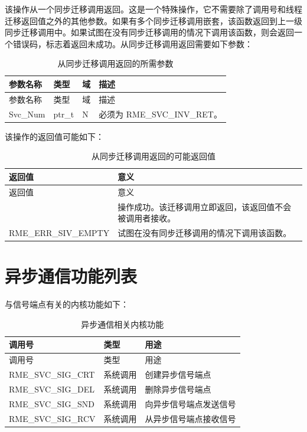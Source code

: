该操作从一个同步迁移调用返回。这是一个特殊操作，它不需要除了调用号和线程迁移返回值之外的其他参数。如果有多个同步迁移调用嵌套，该函数返回到上一级同步迁移调用中。如果试图在没有同步迁移调用的情况下调用该函数，则会返回一个错误码，标志着返回未成功。从同步迁移调用返回需要如下参数：

\begin{xltabular}{\textwidth}{@{}>{\hsize\raggedright\arraybackslash}X>{\hsize\raggedright\arraybackslash}X>{\hsize\raggedright\arraybackslash}X>{\hsize\raggedright\arraybackslash}X@{}}
\caption{从同步迁移调用返回的所需参数}\label{tab:5-12-return-from-sync-invocation-parameters}\\
\toprule
参数名称 & 类型 & 域 & 描述\tabularnewline
\endfirsthead
\toprule
参数名称 & 类型 & 域 & 描述\tabularnewline
\midrule
\endhead
\bottomrule
\endlastfoot
Svc\_Num & ptr\_t & N & 必须为 RME\_SVC\_INV\_RET。\tabularnewline
\end{xltabular}

该操作的返回值可能如下：

\begin{xltabular}{\textwidth}{@{}>{\hsize\raggedright\arraybackslash}X>{\hsize\raggedright\arraybackslash}X@{}}
\caption{从同步迁移调用返回的可能返回值}\label{tab:5-13-return-from-sync-invocation-return-values}\\
\toprule
返回值 & 意义\tabularnewline
\endfirsthead
\toprule
返回值 & 意义\tabularnewline
\midrule
\endhead
\bottomrule
{} & 操作成功。该迁移调用立即返回，该返回值不会被调用者接收。\tabularnewline
    RME\_ERR\_SIV\_EMPTY & 试图在没有同步迁移调用的情况下调用该函数。\tabularnewline
\end{xltabular}

\section{异步通信功能列表}\label{sec:5-async-communication-function-list}

与信号端点有关的内核功能如下：

\begin{xltabular}{\textwidth}{@{}>{\hsize\raggedright\arraybackslash}X>{\hsize\raggedright\arraybackslash}X>{\hsize\raggedright\arraybackslash}X@{}}
\caption{异步通信相关内核功能}\label{tab:5-14-async-communication-kernel-functions}\\
\toprule
调用号 & 类型 & 用途\tabularnewline
\endfirsthead
\toprule
调用号 & 类型 & 用途\tabularnewline
\midrule
\endhead
\bottomrule
\endlastfoot
RME\_SVC\_SIG\_CRT & 系统调用 & 创建异步信号端点\tabularnewline
RME\_SVC\_SIG\_DEL & 系统调用 & 删除异步信号端点\tabularnewline
RME\_SVC\_SIG\_SND & 系统调用 & 向异步信号端点发送信号\tabularnewline
RME\_SVC\_SIG\_RCV & 系统调用 & 从异步信号端点接收信号\tabularnewline
\end{xltabular}

